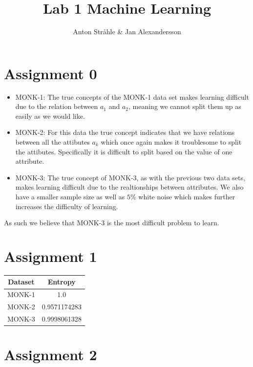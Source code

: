 \documentclass{article}
\begin{document}
\title{Lab 1 Machine Learning}
\author{Anton Stråhle \& Jan Alexandersson}
\maketitle 

\section*{Assignment 0}

\begin{itemize}
 \item MONK-1: The true concepts of the MONK-1 data set makes learning difficult due to the relation between $a_1$ and $a_2$, meaning we cannot split them up as easily as we would like. 
 \item MONK-2: For this data the true concept indicates that we have relations between all the attibutes $a_k$ which once again makes it troublesome to split the attibutes. Specifically it is difficult to split based on the value of one attribute.
 \item MONK-3: The true concept of MONK-3, as with the previous two data sets, makes learning difficult due to the realtionships between attributes. We also have a smaller sample size as well as $5\%$ white noise which makes further increases the difficulty of learning.
 \end{itemize}
 
 As such we believe that MONK-3 is the most difficult problem to learn.


\section*{Assignment 1}

\begin{center}
 \begin{tabular}{|c | c|} 
 \hline
 Dataset & Entropy  \\ [0.5ex] 
 \hline \hline
 MONK-1 & 1.0 \\ 
 MONK-2 & 0.9571174283 \\ 
 MONK-3 & 0.9998061328 \\ [1ex] 
 \hline
\end{tabular}
\end{center}


\section*{Assignment 2}
\end{document}
